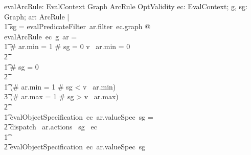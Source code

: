 \documentclass[fuzz]{llncs}
\def\pass{{\mathbbm{p}}}
\def\fail{{\mathbbm{f}}}
\def\dunno{\varnothing}
\def\nomatch{\mathbbm{z}}
\begin{document}
\begin{gendef}
   evalArcRule: EvalContext \fun Graph \fun ArcRule \fun OptValidity
\where
   \forall ec: EvalContext; g, sg: Graph; ar: ArcRule | \\ 
\t1 sg = evalPredicateFilter~ar.filter~ec.graph @ \\
evalArcRule~ec~g~ar = \\
\t1 \IF \# ar.min = 1 \land \# sg = 0 \land  v~ ar.min = 0 \\
\t2 \THEN \nomatch \\
\t1 \ELSE \IF \# sg = 0 \\
\t2 \THEN \dunno \\
\t1 \ELSE \IF (\# ar.min = 1 \land \# sg < v~ ar.min) \lor \\
\t3 (\# ar.max = 1 \land \# sg > v~ ar.max) \\
\t2 \THEN \fail \\
\t1 \ELSE \IF evalObjectSpecification~ec~ar.valueSpec~sg = \pass \\
\t2 \THEN dispatch~ ar.actions~ sg~ ec \\
\t1 \ELSE \\
\t2  evalObjectSpecification~ec~ar.valueSpec~sg
\end{gendef}
\end{document}

